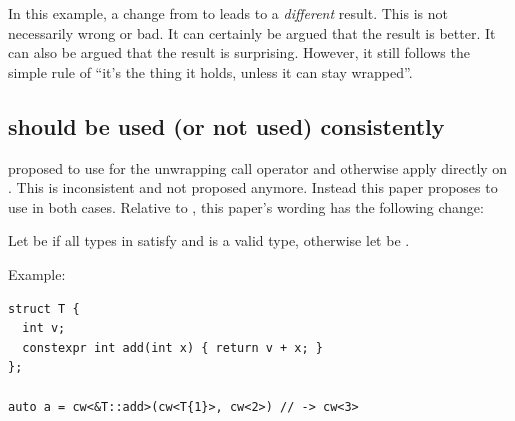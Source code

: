 In this example, a change from  to  leads to a \emph{different} result.
This is not necessarily wrong or bad.
It can certainly be argued that the  result is better.
It can also be argued that the  result is surprising.
However, it still follows the simple rule of “it's the thing it holds, unless it can stay wrapped”.

\subsection{ should be used (or not used) consistently}

\cite{P3978R1} proposed to use  for the unwrapping call operator and otherwise
apply  directly on .
This is inconsistent and not proposed anymore.
Instead this paper proposes to use  in both cases.
Relative to \cite{P3978R1}, this paper's wording has the following change:
\begin{wgText}\setcounter{Paras}{4}
\begin{itemdescr}
\pnum
  Let  be
   if all types in
   satisfy  and
   is a valid type, otherwise
  let  be .
\end{itemdescr}
\end{wgText}
Example:
\medskip\begin{lstlisting}[style=Vc]
struct T {
  int v;
  constexpr int add(int x) { return v + x; }
};

auto a = cw<&T::add>(cw<T{1}>, cw<2>) // -> cw<3>
\end{lstlisting}

